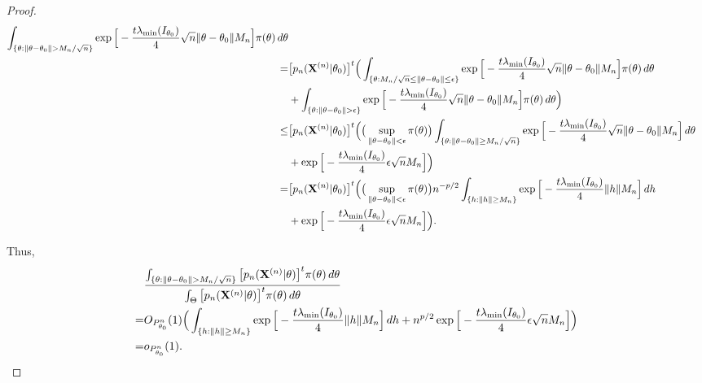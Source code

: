 \documentclass[3p]{elsarticle}
\theoremstyle{plain}
\theoremstyle{definition}
\theoremstyle{remark}
\begin{document}
\begin{proof}
$$\begin{aligned}
        \int_{\{\theta:\|\theta-\theta_0\|> M_n/\sqrt{n}\}} 
        \exp\Big[-\frac{t\lambda_{\min}(I_{\theta_0})}{4}\sqrt{n}\|\theta-\theta_0\|M_n\Big]
        \pi(\theta)\, d\theta
        \\
        =&
        \big[p_n(\BX^{(n)}|\theta_0)\big]^t 
        \Big(
        \int_{\{\theta:M_n/\sqrt{n}\leq \|\theta-\theta_0\|\leq \epsilon \}} 
        \exp\Big[-\frac{t\lambda_{\min}(I_{\theta_0})}{4}\sqrt{n}\|\theta-\theta_0\|M_n\Big]
        \pi(\theta)\, d\theta
        \\
        &+
        \int_{\{\theta:\|\theta-\theta_0\|> \epsilon\}} 
        \exp\Big[-\frac{t\lambda_{\min}(I_{\theta_0})}{4}\sqrt{n}\|\theta-\theta_0\|M_n\Big]
        \pi(\theta)\, d\theta
        \Big)
        \\
        \leq& 
        \big[p_n(\BX^{(n)}|\theta_0)\big]^t 
        \Big(
        \big(\sup_{\|\theta-\theta_0\|<\epsilon}\pi(\theta)\big)
        \int_{\{\theta: \|\theta-\theta_0\|\geq M_n/\sqrt{n}\}} 
        \exp\Big[-\frac{t\lambda_{\min}(I_{\theta_0})}{4}\sqrt{n}\|\theta-\theta_0\|M_n\Big]
        \, d\theta
        \\
        &+
        \exp\Big[-\frac{t\lambda_{\min}(I_{\theta_0})}{4}\epsilon\sqrt{n}M_n\Big]
        \Big)
        \\
        =& 
        \big[p_n(\BX^{(n)}|\theta_0)\big]^t 
        \Big(
        \big(\sup_{\|\theta-\theta_0\|<\epsilon}\pi(\theta)\big)
        n^{-p/2}
        \int_{\{h: \|h\|\geq M_n\}} 
        \exp\Big[-\frac{t\lambda_{\min}(I_{\theta_0})}{4}\|h\| M_n\Big]
        \, dh
        \\
        &+
        \exp\Big[-\frac{t\lambda_{\min}(I_{\theta_0})}{4}\epsilon\sqrt{n}M_n\Big]
        \Big).
    \end{aligned}
$$

Thus,
$$
    \begin{aligned}
        &\frac{
            \int_{\{\theta:\|\theta-\theta_0\|> M_n/\sqrt{n}\}} \big[p_n(\BX^{(n)}|\theta)\big]^t \pi(\theta)\, d\theta
        }
        {
            \int_{\Theta} \big[p_n(\BX^{(n)}|\theta)\big]^t \pi(\theta)\, d\theta
        }
        \\
        =&
        O_{P_{\theta_0}^n}(1)
        \Big(
        \int_{\{h: \|h\|\geq M_n\}} 
        \exp\Big[-\frac{t\lambda_{\min}(I_{\theta_0})}{4}\|h\| M_n\Big]
        \, dh
        +
        n^{p/2}\exp\Big[-\frac{t\lambda_{\min}(I_{\theta_0})}{4}\epsilon\sqrt{n}M_n\Big]
        \Big)
        \\
        =&o_{P^n_{\theta_0}}(1).
    \end{aligned}
$$

\end{proof}
\end{document}

